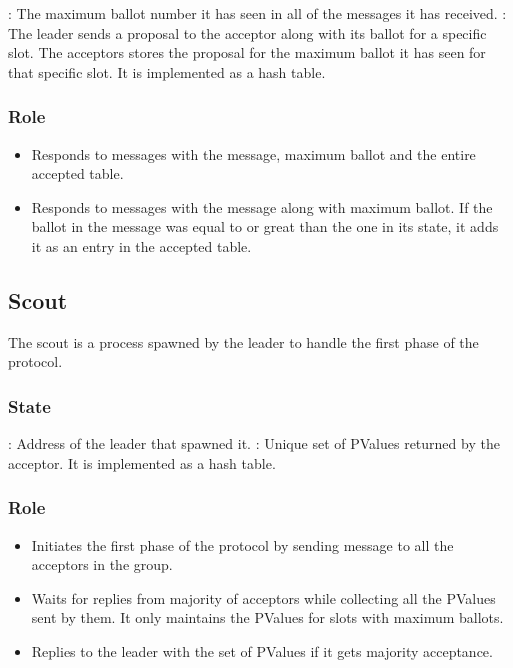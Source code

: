 \begin{itemize}
    : The maximum ballot number it has seen in all
    of the messages it has received.
    : The leader sends a proposal to the acceptor along with
    its ballot for a specific slot. The acceptors stores the proposal for
    the maximum ballot it has seen for that specific slot. It is implemented as
    a hash table.
\end{itemize}

\subsubsection{Role}

\begin{itemize}
  \item Responds to  messages with the  message,
    maximum ballot and the entire accepted table.
  \item Responds to  messages with the  message
    along with maximum ballot. If the ballot in the  message
    was equal to or great than the one in its state, it adds it as
    an entry in the accepted table.
\end{itemize}

\subsection{Scout}

The scout is a process spawned by the leader to handle the first phase of the
protocol.

\subsubsection{State}
\label{section:scout.state}

\begin{itemize}
    : Address of the leader that spawned it.
    :%
    Unique set of PValues returned by the acceptor. It is implemented as a
    hash table.
\end{itemize}

\subsubsection{Role}

\begin{itemize}
  \item Initiates the first phase of the protocol by sending 
    message to all the acceptors in the group.
  \item Waits for replies from majority of acceptors while collecting
    all the PValues sent by them. It only maintains the PValues for slots
    with maximum ballots.
  \item Replies to the leader with the set of PValues if it gets majority
    acceptance.
\end{itemize}


